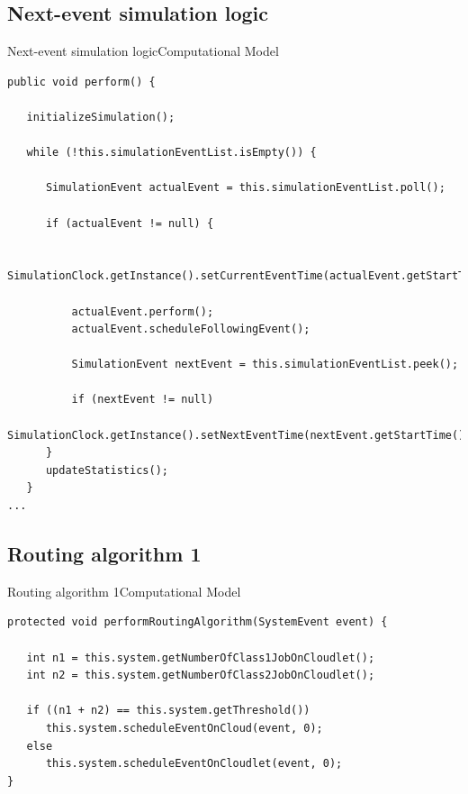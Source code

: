 \documentclass[10pt]{beamer}
\begin{document}
\subsection{Next-event simulation logic}
\begin{frame}[fragile]{Next-event simulation logic}{Computational Model}

\begin{lstlisting}[frame=lines, caption={Snippet of \texttt{perform} method}, label={code:perform}]
public void perform() {

   initializeSimulation();
   
   while (!this.simulationEventList.isEmpty()) {

      SimulationEvent actualEvent = this.simulationEventList.poll();

      if (actualEvent != null) {

          SimulationClock.getInstance().setCurrentEventTime(actualEvent.getStartTime());

          actualEvent.perform();
          actualEvent.scheduleFollowingEvent();

          SimulationEvent nextEvent = this.simulationEventList.peek();

          if (nextEvent != null)
              SimulationClock.getInstance().setNextEventTime(nextEvent.getStartTime());
      }
      updateStatistics();
   }
...
\end{lstlisting}
\end{frame}

\subsection{Routing algorithm 1}
\begin{frame}[fragile]{Routing algorithm 1}{Computational Model}

\begin{lstlisting}
protected void performRoutingAlgorithm(SystemEvent event) {

   int n1 = this.system.getNumberOfClass1JobOnCloudlet();
   int n2 = this.system.getNumberOfClass2JobOnCloudlet();

   if ((n1 + n2) == this.system.getThreshold())
      this.system.scheduleEventOnCloud(event, 0);
   else
      this.system.scheduleEventOnCloudlet(event, 0);
}
\end{lstlisting}
\end{frame}
\end{document}
